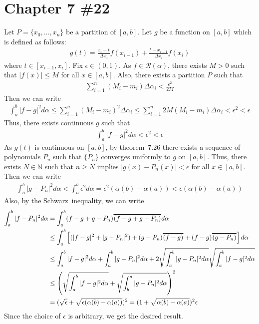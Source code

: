 \documentclass{scrartcl}
\newcommand\Overline[2][0.8pt]{%
  \begin{tikzpicture}[baseline=(a.base)]
    \node[inner xsep=0pt,inner ysep=1.5pt] (a) {$#2$};
    \draw[line width= #1] (a.north west) -- (a.north east);
  \end{tikzpicture}
}
\begin{document}
\section{Chapter 7 \#22}
Let \(P = \{x_0, \dots, x_n\}\) be a partition of \([a, b]\). Let \(g\) be a
function on \([a, b]\) which is defined as follows:
\begin{align*}
  g(t)
  = \frac{x_i - t}{\Delta x_i} f(x_{i - 1})
    + \frac{t - x_{i - 1}}{\Delta x_i} f(x_i)
\end{align*}
where \(t \in [x_{i - 1}, x_i]\). Fix \(\epsilon \in (0, 1)\). As \(f \in
\mathscr{R}(\alpha)\), there exists \(M > 0\) such that \(|f(x)| \le M\) for
all \(x \in [a, b]\). Also, there exists a partition \(P\) such that
\begin{align*}
  \sum^n_{i = 1} (M_i - m_i) \Delta\alpha_i
  < \frac{\epsilon^2}{2M}
\end{align*}
Then we can write
\begin{align*}
  \int^b_a |f - g|^2 d\alpha
  \le \sum^n_{i = 1} (M_i - m_i)^2 \Delta\alpha_i
  \le \sum^n_{i = 1} 2M(M_i - m_i) \Delta\alpha_i
  < \epsilon^2
  < \epsilon
\end{align*}
Thus, there exists continuous \(g\) such that
\begin{align*}
  \int^b_a |f - g|^2 d\alpha
  < \epsilon^2
  < \epsilon
\end{align*}
As \(g(t)\) is continuous on \([a, b]\), by theorem~7.26 there exists a
sequence of polynomials \(P_n\) such that \(\{P_n\}\) converges uniformly to
\(g\) on \([a, b]\). Thus, there exists \(N \in \mathbb{N}\) such that \(n \ge
N\) implies \(|g(x) - P_n(x)| < \epsilon\) for all \(x \in [a, b]\). Then
we can write
\begin{align*}
  \int^b_a |g - P_n|^2 d\alpha
  < \int^b_a \epsilon^2 d\alpha
  = \epsilon^2 (\alpha(b) - \alpha(a))
  < \epsilon (\alpha(b) - \alpha(a))
\end{align*}
Also, by the Schwarz~inequality, we can write
\begin{align*}
  \int^b_a |f - P_n|^2 d\alpha
  &= \int^b_a (f - g + g - P_n) \Overline{(f - g + g - P_n)} d\alpha \\
  &\le \int^b_a \left[ (|f - g|^2 + |g - P_n|^2) + (g - P_n)\Overline{(f - g)}
    + (f - g)\Overline{(g - P_n)}\right] d\alpha \\
  &\le \int^b_a |f - g|^2 d\alpha + \int^b_a |g - P_n|^2 d\alpha
    + 2\sqrt{\int^b_a |g - P_n|^2 d\alpha}\sqrt{\int^b_a |f - g|^2 d\alpha} \\
  &\le \left( \sqrt{\int^b_a |f - g|^2 d\alpha}
    + \sqrt{\int^a_b |g - P_n|^2 d\alpha} \right)^2 \\
  &= (\sqrt{\epsilon} + \sqrt{\epsilon(\alpha(b) - \alpha(a))})^2
  = (1 + \sqrt{\alpha(b) - \alpha(a)})^2 \epsilon
\end{align*}
Since the choice of \(\epsilon\) is arbitrary, we get the desired result.
\end{document}
